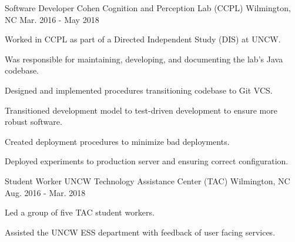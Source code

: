 

\begin{cventries}
  \cventry
    {Software Developer} %
    {Cohen Cognition and Perception Lab (CCPL)} %
    {Wilmington, NC} %
    {Mar. 2016 - May 2018} %
    {
      \begin{cvitems}
        \item {Worked in CCPL as part of a Directed Independent Study (DIS) at UNCW.}
        \item {Was responsible for maintaining, developing, and documenting the lab's Java codebase.}
        \item {Designed and implemented procedures transitioning codebase to Git VCS.}
        \item {Transitioned development model to test-driven development to ensure more robust software.}
        \item {Created deployment procedures to minimize bad deployments.}
        \item {Deployed experiments to production server and ensuring correct configuration.}
      \end{cvitems}
    }
  \cventry
    {Student Worker}
    {UNCW Technology Assistance Center (TAC)} %
    {Wilmington, NC} %
    {Aug. 2016 - Mar. 2018} %
    {
      \begin{cvsubentries}
        {
          \begin{cvsubitems}
            \item {Led a group of five TAC student workers.}
            \item {Assisted the UNCW ESS department with feedback of user facing services.}
          \end{cvsubitems}
        }

\end{cvsubentries}}
\end{cventries}
